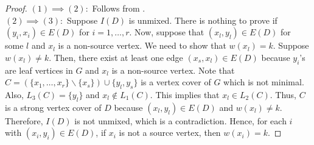 \documentclass[11pt,reqno]{amsart}
\theoremstyle{definition}
\begin{document}
\begin{proof}
	$(1) \implies (2):$ Follows from \cite[Corollary 3.1.17]{v15}. \\
	$(2) \implies (3):$ Suppose $I(D)$ is unmixed. There is nothing to prove if $(y_i,x_i) \in E(D)$ for $i=1,\ldots,r$. Now, suppose that $(x_l, y_l) \in E(D)$ for some $l$ and $x_l$ is a non-source vertex. We need to show that $w(x_l)=k$. Suppose $w(x_l) \neq k$. Then, there exist at least one edge $(x_s,x_l) \in E(D)$ because $y_i$'s are leaf vertices in $G$ and $x_l$ is a non-source vertex. Note that $C = \left(\{x_1, \ldots, x_r\} \backslash \{x_s\}\right) \cup \{y_l, y_s\}$ is a vertex cover of $G$ which is not minimal. Also, $L_3(C) = \{y_l\}$ and $x_l \notin L_1(C)$. This implies that $x_l \in L_2(C)$. Thus, $C$ is a strong vertex cover of $D$ because $(x_l, y_l) \in E(D)$ and $w(x_l) \neq k$. Therefore, $I(D)$ is not unmixed, which is a contradiction. Hence, for each $i$ with $(x_i,y_i) \in E(D)$, if  $x_i$ is not a source vertex, then $w(x_i)=k$. 
	

\end{proof}
\end{document}
